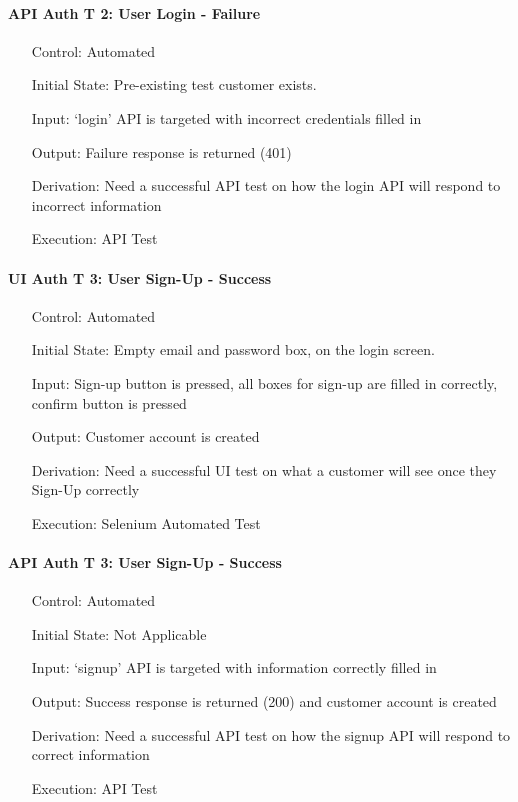 \documentclass[12pt, titlepage]{article}
\begin{document}
\paragraph*{API Auth T 2: User Login - Failure}
\begin{itemize}
	\item[Control:] Automated
	\item[Initial State:] Pre-existing test customer exists.
	\item[Input:] `login' API is targeted with incorrect credentials filled in
	\item[Output:] Failure response is returned (401)
	\item[Derivation:] Need a successful API test on how the login API will respond to incorrect information
	\item[Execution:] API Test
\end{itemize}

\paragraph*{UI Auth T 3: User Sign-Up - Success}
\begin{itemize}
	\item[Control:] Automated
	\item[Initial State:] Empty email and password box, on the login screen.
	\item[Input:] Sign-up button is pressed, all boxes for sign-up are filled in correctly, confirm button is pressed
	\item[Output:] Customer account is created
	\item[Derivation:] Need a successful UI test on what a customer will see once they Sign-Up correctly
	\item[Execution:] Selenium Automated Test
\end{itemize}

\paragraph*{API Auth T 3: User Sign-Up - Success}
\begin{itemize}
	\item[Control:] Automated
	\item[Initial State:] Not Applicable
	\item[Input:] `signup' API is targeted with information correctly filled in
	\item[Output:] Success response is returned (200) and customer account is created
	\item[Derivation:] Need a successful API test on how the signup API will respond to correct information
	\item[Execution:] API Test
\end{itemize}
\end{document}
